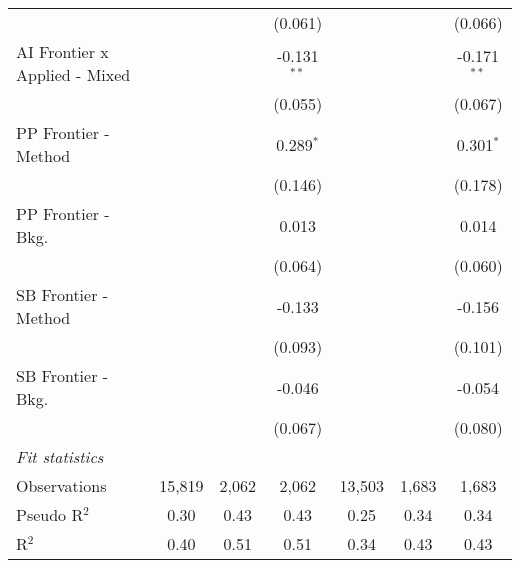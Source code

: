 \begin{tabular}{lcccccc}
                                 &         &              & (0.061)       &              &         & (0.066)\\   
   AI Frontier x Applied - Mixed &         &              & -0.131$^{**}$ &              &         & -0.171$^{**}$\\   
                                 &         &              & (0.055)       &              &         & (0.067)\\   
   PP Frontier - Method          &         &              & 0.289$^{*}$   &              &         & 0.301$^{*}$\\   
                                 &         &              & (0.146)       &              &         & (0.178)\\   
   PP Frontier - Bkg.            &         &              & 0.013         &              &         & 0.014\\   
                                 &         &              & (0.064)       &              &         & (0.060)\\   
   SB Frontier - Method          &         &              & -0.133        &              &         & -0.156\\   
                                 &         &              & (0.093)       &              &         & (0.101)\\   
   SB Frontier - Bkg.            &         &              & -0.046        &              &         & -0.054\\   
                                 &         &              & (0.067)       &              &         & (0.080)\\   
   \midrule
   \emph{Fit statistics}\\
   Observations                  & 15,819  & 2,062        & 2,062         & 13,503       & 1,683   & 1,683\\  
   Pseudo R$^2$                  & 0.30    & 0.43         & 0.43          & 0.25         & 0.34    & 0.34\\  
   R$^2$                         & 0.40    & 0.51         & 0.51          & 0.34         & 0.43    & 0.43\\  
   

\end{tabular}
